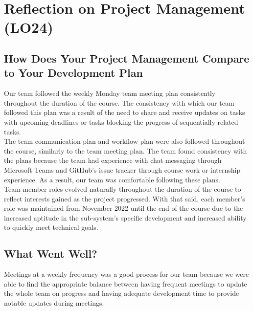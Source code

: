 \documentclass[12pt]{article}
\begin{document}
\section{Reflection on Project Management (LO24)}


\subsection{How Does Your Project Management Compare to Your Development Plan}


Our team followed the weekly Monday team meeting plan consistently throughout the duration of the course. The consistency with which our team followed this plan was a result of the need to share and receive updates on tasks with upcoming deadlines or tasks blocking the progress of sequentially related tasks. \\

The team communication plan and workflow plan were also followed throughout the course, similarly to the team meeting plan. The team found consistency with the plans because the team had experience with chat messaging through Microsoft Teams and GitHub's issue tracker through course work or internship experience. As a result, our team was comfortable following these plans. \\

Team member roles evolved naturally throughout the duration of the course to reflect interests gained as the project progressed. With that said, each member's role was maintained from November 2022 until the end of the course due to the increased aptitude in the sub-system's specific development and increased ability to quickly meet technical goals. \\



\subsection{What Went Well?}


Meetings at a weekly frequency was a good process for our team because we were able to find the appropriate balance between having frequent meetings to update the whole team on progress and having adequate development time to provide notable updates during meetings. \\
\end{document}
